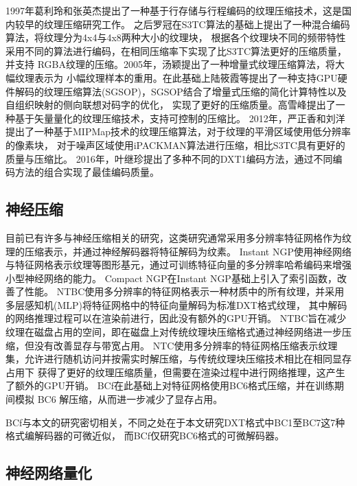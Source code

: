 1997年葛利玲和张英杰\cite{JSGG712.006}提出了一种基于行存储与行程编码的纹理压缩技术，这是国内较早的纹理压缩研究工作。
之后罗冠\cite{2001008022.nh}在S3TC算法的基础上提出了一种混合编码算法，将纹理分为4x4与4x8两种大小的纹理块，
根据各个纹理块不同的频带特性采用不同的算法进行编码，在相同压缩率下实现了比S3TC算法更好的压缩质量，并支持
RGBA纹理的压缩。2005年，汤颖\cite{2005044039.nh}提出了一种增量式纹理压缩算法，将大幅纹理表示为
小幅纹理样本的重用。在此基础上陆筱霞等\cite{XTFZ2009S1011}提出了一种支持GPU硬件解码的纹理压缩算法(SGSOP)，SGSOP结合了增量式压缩的简化计算特性以及自组织映射的侧向联想对码字的优化，
实现了更好的压缩质量。高雪峰\cite{2005064449.nh}提出了一种基于矢量量化的纹理压缩技术，支持可控制的压缩比。
2012年，严正香和刘洋\cite{XYNG201201041}提出了一种基于MIPMap技术的纹理压缩算法，对于纹理的平滑区域使用低分辨率的像素块，
对于噪声区域使用iPACKMAN算法进行压缩，相比S3TC具有更好的质量与压缩比。
2016年，叶继珍\cite{1016164136.nh}提出了多种不同的DXT1编码方法，通过不同编码方法的组合实现了最佳编码质量。

\subsection{神经压缩}

目前已有许多与神经压缩相关的研究，这类研究通常采用多分辨率特征网格作为纹理的压缩表示，并通过神经解码器将特征解码为纹素。
Instant NGP\cite{muller2022instant}使用神经网络与特征网格表示纹理等图形基元，通过可训练特征向量的多分辨率哈希编码来增强小型神经网络的能力。
Compact NGP\cite{takikawa2023compact}在Instant NGP基础上引入了索引函数，改善了性能。
NTBC\cite{fujieda2024neural}使用多分辨率的特征网格表示一种材质中的所有纹理，并采用多层感知机(MLP)将特征网格中的特征向量解码为标准DXT格式纹理，
其中解码的网络推理过程可以在渲染前进行，因此没有额外的GPU开销。
NTBC旨在减少纹理在磁盘占用的空间，即在磁盘上对传统纹理块压缩格式通过神经网络进一步压缩，但没有改善显存与带宽占用。
NTC\cite{vaidyanathan2023random}使用多分辨率的特征网格压缩表示纹理集，允许进行随机访问并按需实时解压缩，与传统纹理块压缩技术相比在相同显存占用下
获得了更好的纹理压缩质量，但需要在渲染过程中进行网络推理，这产生了额外的GPU开销。
BCf\cite{weinreich2024real}在此基础上对特征网格使用BC6格式压缩，并在训练期间模拟 BC6 解压缩，从而进一步减少了显存占用。

BCf\cite{weinreich2024real}与本文的研究密切相关，不同之处在于本文研究DXT格式中BC1至BC7这7种格式编解码器的可微近似，
而BCf\cite{weinreich2024real}仅研究BC6格式的可微解码器。

\subsection{神经网络量化}

